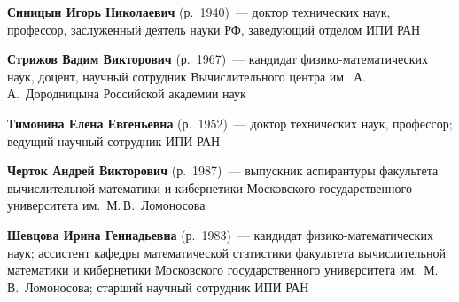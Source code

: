 \begin{multicols}{2}
\vspace*{2pt}

\noindent
\textbf{Синицын Игорь Николаевич} (р.\ 1940)~--- 
доктор технических наук, профессор, заслуженный деятель науки РФ, заведующий отделом
ИПИ РАН

\vspace*{2pt}



\noindent
\textbf{Стрижов Вадим Викторович} (р.\ 1967)~--- кандидат фи\-зи\-ко-ма\-те\-ма\-ти\-че\-ских 
наук, доцент, научный сотрудник Вычислительного центра им.\ А.\,А.~Дородницына 
Российской академии наук  

\columnbreak


\noindent
\textbf{Тимонина Елена Евгеньевна} (р.\ 1952)~--- доктор технических наук, профессор; 
ведущий научный сотрудник ИПИ РАН

\vspace*{8pt}

\noindent
\textbf{Черток Андрей Викторович} (р.\ 1987)~--- выпускник аспирантуры факультета 
вычислительной математики и кибернетики Московского государственного университета
им.\ М.\,В.~Ломоносова

\vspace*{8pt}

\noindent
\textbf{Шевцова Ирина Геннадьевна} (р.\ 1983)~--- кандидат фи\-зи\-ко-ма\-те\-ма\-ти\-че\-ских 
наук; ассистент кафедры математической статистики факультета вычислительной математики и 
кибернетики Московского государственного университета им.\ М.\,В.~Ломоносова; 
старший научный сотрудник ИПИ РАН






\end{multicols}

\newpage